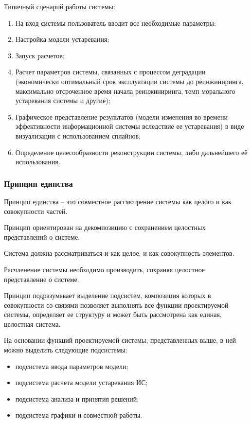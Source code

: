 Типичный сценарий работы системы: 
\begin{enumerate}
    \item На вход системы пользователь вводит все необходимые параметры;
    \item Настройка модели устаревания;
    \item Запуск расчетов;
    \item Расчет параметров системы, связанных с процессом деградации (экономически оптимальный срок эксплуатации системы до реинжиниринга, максимально отсроченное время начала реинжиниринга, темп морального устаревания системы и другие);
    \item Графическое представление результатов (модели изменения во времени эффективности информационной системы вследствие ее устаревания) в виде визуализации с использованием сплайнов;
    \item Определение целесообразности реконструкции системы, либо дальнейшего её использования. 
\end{enumerate}

\subsubsection{Принцип единства}
Принцип единства – это совместное рассмотрение системы как целого и как совокупности частей.

Принцип ориентирован на декомпозицию с сохранением целостных представлений о системе.

Система должна рассматриваться и как целое, и как совокупность элементов.

Расчленение системы необходимо производить, сохраняя целостное представление о системе.

Принцип подразумевает выделение подсистем, композиция которых в совокупности со связями позволяет выполнять все функции проектируемой системы, определяет ее структуру и может быть рассмотрена как единая, целостная система.

На основании функций проектируемой системы, представленных выше, в ней можно выделить следующие подсистемы:
\begin{itemize}
    \item подсистема ввода параметров модели;
    \item подсистема расчета модели устаревания ИС;
    \item подсистема анализа и принятия решений;
    \item подсистема графики и совместной работы.
\end{itemize}

